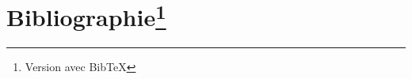 \documentclass[11pt]{rapport}
\begin{document}
\listofannexes


\clearemptydoublepage
{}
\section*{Bibliographie\footnote{
Version avec BibTeX}}

\nocite{*} %

\end{document}
